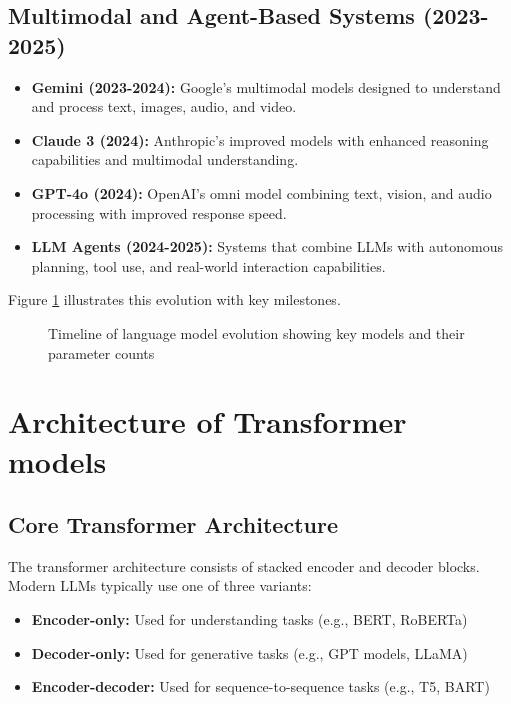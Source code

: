 \documentclass[11pt,a4paper]{report}
\begin{document}
\subsection{Multimodal and Agent-Based Systems (2023-2025)}
\begin{itemize}
    \item \textbf{Gemini (2023-2024):} Google's multimodal models designed to understand and process text, images, audio, and video.
    
    \item \textbf{Claude 3 (2024):} Anthropic's improved models with enhanced reasoning capabilities and multimodal understanding.
    
    \item \textbf{GPT-4o (2024):} OpenAI's omni model combining text, vision, and audio processing with improved response speed.
    
    \item \textbf{LLM Agents (2024-2025):} Systems that combine LLMs with autonomous planning, tool use, and real-world interaction capabilities.
\end{itemize}

Figure \ref{fig:llm-timeline} illustrates this evolution with key milestones.

\begin{figure}[ht]
    \centering
    
    \caption{Timeline of language model evolution showing key models and their parameter counts}
    \label{fig:llm-timeline}
\end{figure}

\section{Architecture of Transformer models}

\subsection{Core Transformer Architecture}
The transformer architecture consists of stacked encoder and decoder blocks. Modern LLMs typically use one of three variants:

\begin{itemize}
    \item \textbf{Encoder-only:} Used for understanding tasks (e.g., BERT, RoBERTa)
    \item \textbf{Decoder-only:} Used for generative tasks (e.g., GPT models, LLaMA)
    \item \textbf{Encoder-decoder:} Used for sequence-to-sequence tasks (e.g., T5, BART)
\end{itemize}
\end{document}
